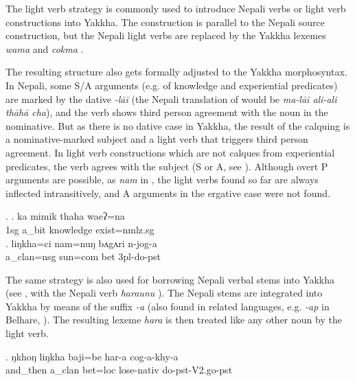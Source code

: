  The light verb strategy is commonly used to introduce Nepali verbs or light verb constructions into Yakkha. The construction is parallel to the Nepali source construction, but the Nepali light verbs are replaced by the Yakkha lexemes \emph{wama}  and \emph{cokma} . 
 
 The resulting structure also gets formally adjusted to the Yakkha morphosyntax. In Nepali, some S/A arguments  (e.g. of knowledge and experiential predicates) are marked by the dative \emph{-lāī} (the Nepali translation of \Next[a] would be \emph{ma-lāī ali-ali thāhā cha}), and the verb shows third person agreement with the noun in the nominative. But as there is no dative case in Yakkha, the result of the calquing is a nominative-marked subject and a light verb that triggers third person agreement. In light verb constructions which are not calques from experiential predicates, the verb agrees with the subject (S or A, see \Next[b]). Although overt P arguments are possible, as \emph{nam}   in \Next[b], the light verbs found so far are always inflected intransitively, and A arguments in the ergative case were not found.

\ex. \ag. ka mimik   thaha       waeʔ=na\\
		{\sc 1sg} a\_bit knowledge exist{\sc [3sg]=nmlz.sg}\\
	  
	\bg. liŋkha=ci     nam=nuŋ      bʌgʌri n-jog-a\\
	a\_clan{\sc =nsg} sun{\sc =com} bet {\sc 3pl-}do{\sc -pst}\\
	 

	
The same strategy  is also used for borrowing Nepali verbal stems into Yakkha (see \Next, with the Nepali verb \emph{haraunu} ). The Nepali stems are integrated into Yakkha by means of the suffix \emph{-a} (also found in related languages, e.g. \emph{-ap} in Belhare, \citet[559]{Bickel2003Belhare}). The resulting lexeme \emph{hara} is then treated like any other noun by the light verb.

\exg. ŋkhoŋ    liŋkha   baji=be    har-a cog-a-khy-a\\
and\_then a\_clan bet{\sc =loc} lose{\sc -nativ} do{\sc [3sg]-pst-V2.go-pst}    \\

